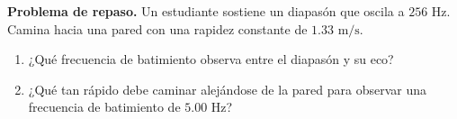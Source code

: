 \item \textbf{Problema de repaso.}
Un estudiante sostiene un diapasón que oscila a $256\text{ Hz}$. Camina hacia una pared con una rapidez constante de $1.33\text{ m/s}$.
\begin{enumerate}
    \item ¿Qué frecuencia de batimiento observa entre el diapasón y su eco?
    \item ¿Qué tan rápido debe caminar alejándose de la pared para observar una frecuencia de batimiento de $5.00\text{ Hz}$?
\end{enumerate}